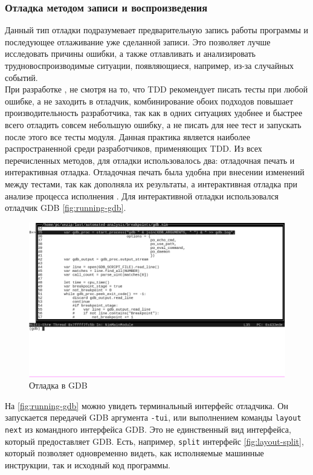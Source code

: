 \subsubsection{Отладка методом записи и воспроизведения}\label{sec:ch2/sec1/sub3/sub5}
Данный тип отладки подразумевает предварительную запись работы
программы и последующее отлаживание уже сделанной записи.
Это позволяет лучше исследовать причины ошибки, а также отлавливать и анализировать
трудновоспроизводимые ситуации, появляющиеся, например, из-за случайных событий.
\\

При разработке {\ProgModule}, не смотря на то, что TDD рекомендует писать тесты
при любой ошибке, а не заходить в отладчик, комбинирование обоих подходов
повышает производительность разработчика, так как в одних ситуациях
удобнее и быстрее всего отладить совсем небольшую ошибку, а не писать для нее тест
и запускать после этого все тесты модуля. Данная практика является
наиболее распространенной среди разработчиков, применяющих TDD.
Из всех перечисленных методов, для отладки {\ProgModule} использовалось два: отладочная
печать и интерактивная отладка. Отладочная печать была удобна при внесении изменений
между тестами, так как дополняла их результаты, а интерактивная отладка при анализе
процесса исполнения {\ProgModule}. Для интерактивной отладки использовался отладчик 
GDB \autoref{fig:running-gdb}.

\begin{figure}[!hbtp]
    \includegraphics[width=\textwidth,height=\textheight,keepaspectratio]{images/running-gdb.png}
    \caption{Отладка {\ProgModule} в GDB\label{fig:running-gdb}}
\end{figure}

На \autoref{fig:running-gdb} можно увидеть терминальный интерфейс отладчика. Он
запускается передачей GDB аргумента \verb|-tui|, или выполнением команды 
\verb|layout next| из командного интерфейса GDB.
Это не единственный вид интерфейса, который предоставляет GDB.
Есть, например, \verb|split| интерфейс \autoref{fig:layout-split},
который позволяет одновременно видеть, как исполняемые машинные инструкции,
так и исходный код программы.

